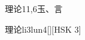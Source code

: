 \begin{entry}{理论}{11,6}{⽟、⾔}
  \begin{phonetics}{理论}{li3lun4}[][HSK 3]
  \end{phonetics}
\end{entry}
